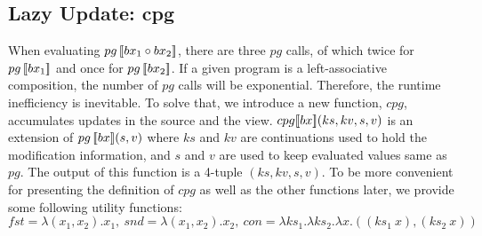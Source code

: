 \subsection{Lazy Update: cpg} 

When evaluating $pg \, [\![bx_1 \circ bx_2]\!]$, there are three $pg$ calls, of which twice for $pg \, [\![bx_1]\!]$ and once for $pg \, [\![bx_2]\!]$. If a given program is a left-associative composition, the number of $pg$ calls will be exponential. Therefore, the runtime inefficiency is inevitable. To solve that, we introduce a new function, $cpg$, accumulates updates in the source and the view. $cpg [\![bx]\!] (ks, kv, s, v)$ is an extension of $pg \, [\![bx]\!] (s, v)$ where $ks$ and $kv$ are continuations used to hold the modification information, and $s$ and $v$ are used to keep evaluated values same as $pg$. The output of this function is a 4-tuple $(ks, kv, s, v)$. To be more convenient for presenting the definition of $cpg$ as well as the other functions later, we provide some following utility functions:\\ $fst = \lambda (x_1,x_2). x_1 , \ snd = \lambda (x_1,x_2). x_2 , \ con = \lambda ks_1. \lambda ks_2. \lambda x. ((ks_1 \ x),(ks_2 \ x))$


